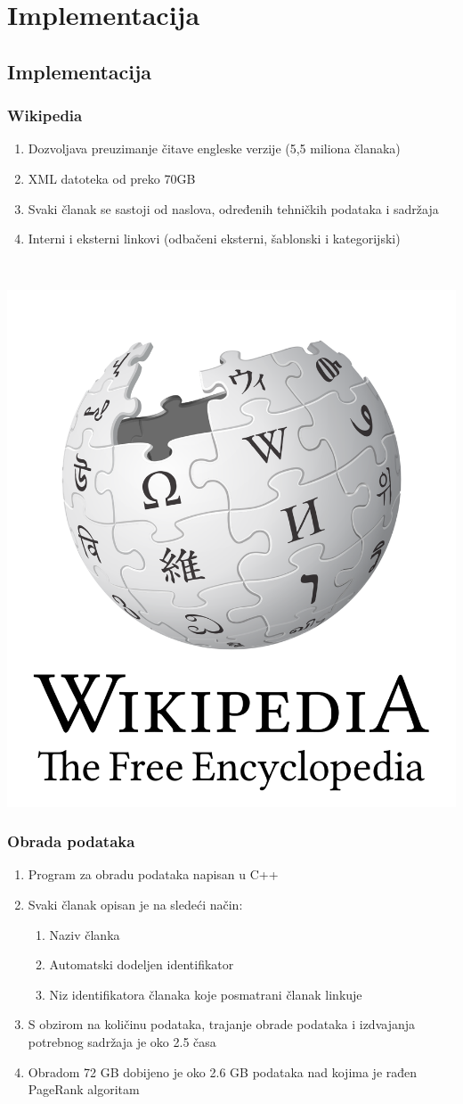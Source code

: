 \documentclass[11pt]{beamer}
\begin{document}
\section{Implementacija}
\subsection{Implementacija}

\begin{frame}
    \frametitle{Wikipedia}
  		\begin{center}
        \begin{enumerate}
            \item Dozvoljava preuzimanje čitave engleske verzije (5,5 miliona članaka)
            \item XML datoteka od preko 70GB 
            \item Svaki članak se sastoji od naslova, određenih tehničkih podataka i sadržaja
            \item Interni i eksterni linkovi (odbačeni eksterni, šablonski i kategorijski)
        \end{enumerate}
        \end{center}
        \leavevmode \\
        \begin{flushright}
            \includegraphics[width=0.25\columnwidth]{wiki.png}
        \end{flushright}
\end{frame}

\begin{frame}
    \frametitle{Obrada podataka}
\begin{center}
    \begin{enumerate}
    \item Program za obradu podataka napisan u C++
    \item Svaki članak opisan je na sledeći način:
        \begin{enumerate}
        \item Naziv članka
        \item Automatski dodeljen identifikator
        \item Niz identifikatora članaka koje posmatrani članak linkuje
        \end{enumerate}
        \item S obzirom na količinu podataka, trajanje obrade podataka i izdvajanja potrebnog sadržaja je oko 2.5 časa
        \item Obradom 72 GB dobijeno je oko 2.6 GB podataka nad kojima je rađen PageRank algoritam
    \end{enumerate}

        \end{center}
\end{frame}
\end{document}
